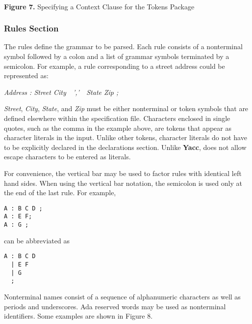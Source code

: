 \hspace{-0.05in}\hrulefill\hspace{0.0in}\\
\centerline{{\bf Figure 7.} Specifying a Context Clause for the Tokens Package}
\newpage
\subsubsection{Rules Section}
The rules
define the grammar to be parsed.  Each rule consists of a
nonterminal symbol followed by a colon and
a list of grammar symbols
terminated by a semicolon.  For example, a rule corresponding
to a street address could be represented as:

{\centerline{\it Address : Street City\ \ ','\ \ State Zip ;}}

{\it Street}, {\it City}, {\it State}, and {\it Zip} must be either
nonterminal or token symbols that are defined elsewhere within the
specification file.  Characters enclosed in single quotes, such
as the comma in the example above, are tokens that appear
as character literals in the input.  Unlike other tokens, character
literals do not have to be explicitly declared in the
declarations section.  Unlike {\bf Yacc}, \ayacc does not allow escape
characters to be entered as literals.

For convenience, the vertical bar may be used to factor rules
with identical left hand sides.  When using the vertical bar
notation, the semicolon is used only at the end of the last rule.  For
example,

\begin{verbatim}
A : B C D ;
A : E F;
A : G ;
\end{verbatim}
can be abbreviated as
\begin{verbatim}
A : B C D
  | E F
  | G
  ;
\end{verbatim}
Nonterminal names consist of a sequence of alphanumeric characters
as well as periods and underscores.  Ada reserved words may be used
as nonterminal identifiers.  Some examples are shown in Figure 8.

